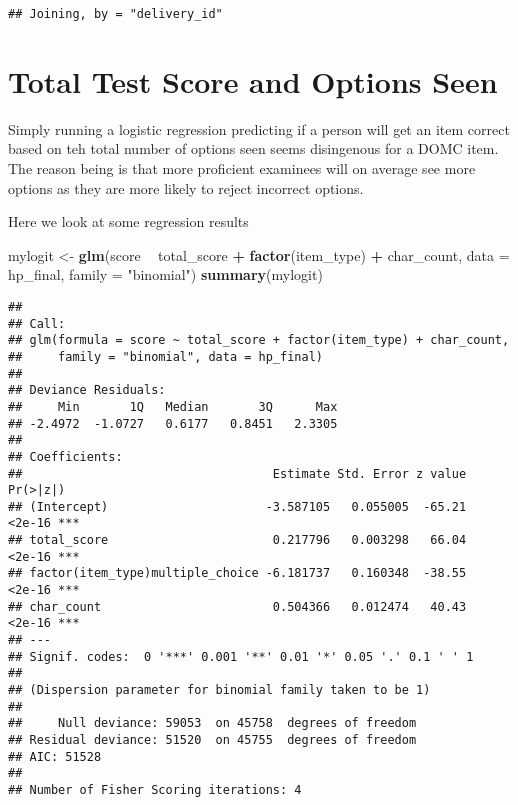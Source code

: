 \documentclass[]{book}
\newenvironment{Shaded}{\begin{snugshade}}{\end{snugshade}}
\newcommand{\KeywordTok}[1]{\textcolor[rgb]{0.13,0.29,0.53}{\textbf{#1}}}
\newcommand{\DataTypeTok}[1]{\textcolor[rgb]{0.13,0.29,0.53}{#1}}
\newcommand{\StringTok}[1]{\textcolor[rgb]{0.31,0.60,0.02}{#1}}
\newcommand{\OperatorTok}[1]{\textcolor[rgb]{0.81,0.36,0.00}{\textbf{#1}}}
\newcommand{\NormalTok}[1]{#1}
\theoremstyle{definition}
\theoremstyle{definition}
\theoremstyle{definition}
\theoremstyle{remark}
\begin{document}
\begin{verbatim}
## Joining, by = "delivery_id"
\end{verbatim}

\begin{Shaded}
\end{Shaded}

\chapter{Total Test Score and Options
Seen}\label{total-test-score-and-options-seen}

Simply running a logistic regression predicting if a person will get an
item correct based on teh total number of options seen seems disingenous
for a DOMC item. The reason being is that more proficient examinees will
on average see more options as they are more likely to reject incorrect
options.

Here we look at some regression results

\begin{Shaded}
\begin{Highlighting}[]
\NormalTok{mylogit <-}\StringTok{ }\KeywordTok{glm}\NormalTok{(score }\OperatorTok{~}\StringTok{ }\NormalTok{total_score }\OperatorTok{+}\StringTok{ }\KeywordTok{factor}\NormalTok{(item_type) }\OperatorTok{+}\StringTok{ }\NormalTok{char_count, }\DataTypeTok{data =}\NormalTok{ hp_final, }\DataTypeTok{family =} \StringTok{"binomial"}\NormalTok{)}
\KeywordTok{summary}\NormalTok{(mylogit) }
\end{Highlighting}
\end{Shaded}

\begin{verbatim}
## 
## Call:
## glm(formula = score ~ total_score + factor(item_type) + char_count, 
##     family = "binomial", data = hp_final)
## 
## Deviance Residuals: 
##     Min       1Q   Median       3Q      Max  
## -2.4972  -1.0727   0.6177   0.8451   2.3305  
## 
## Coefficients:
##                                   Estimate Std. Error z value Pr(>|z|)    
## (Intercept)                      -3.587105   0.055005  -65.21   <2e-16 ***
## total_score                       0.217796   0.003298   66.04   <2e-16 ***
## factor(item_type)multiple_choice -6.181737   0.160348  -38.55   <2e-16 ***
## char_count                        0.504366   0.012474   40.43   <2e-16 ***
## ---
## Signif. codes:  0 '***' 0.001 '**' 0.01 '*' 0.05 '.' 0.1 ' ' 1
## 
## (Dispersion parameter for binomial family taken to be 1)
## 
##     Null deviance: 59053  on 45758  degrees of freedom
## Residual deviance: 51520  on 45755  degrees of freedom
## AIC: 51528
## 
## Number of Fisher Scoring iterations: 4
\end{verbatim}
\end{document}
